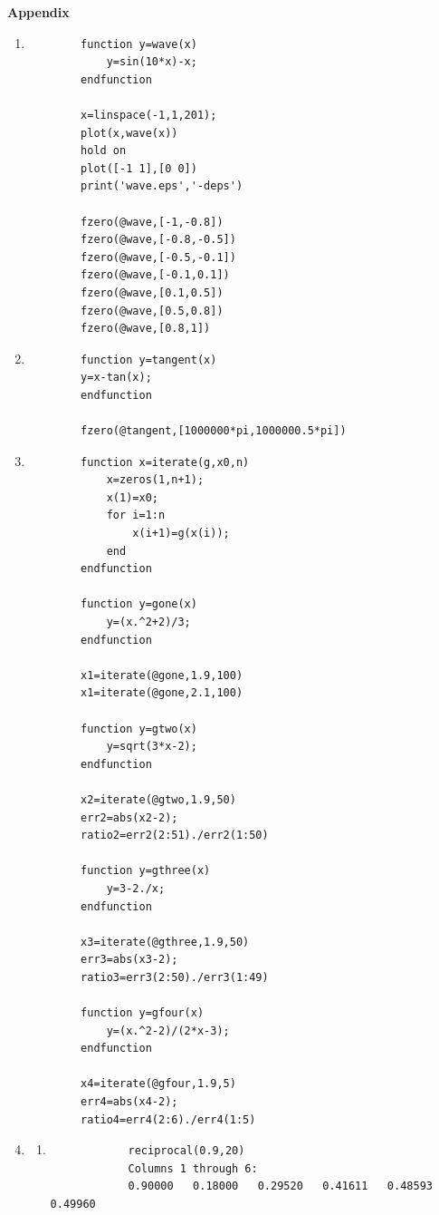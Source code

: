 \documentclass[11pt,a4paper]{article}
\begin{document}
\pagebreak

\textbf{Appendix}

\begin{enumerate}

	\item 
	\begin{verbatim}
		function y=wave(x)
			y=sin(10*x)-x;
		endfunction
		
		x=linspace(-1,1,201);
		plot(x,wave(x))
		hold on 
		plot([-1 1],[0 0])
		print('wave.eps','-deps')

		fzero(@wave,[-1,-0.8])
		fzero(@wave,[-0.8,-0.5])
		fzero(@wave,[-0.5,-0.1])
		fzero(@wave,[-0.1,0.1])
		fzero(@wave,[0.1,0.5])
		fzero(@wave,[0.5,0.8])
		fzero(@wave,[0.8,1])
	\end{verbatim}
	
	\item
	\begin{verbatim}
		function y=tangent(x)
		y=x-tan(x);
		endfunction
		
		fzero(@tangent,[1000000*pi,1000000.5*pi])
	\end{verbatim}
	
	\item
	\begin{verbatim}
		function x=iterate(g,x0,n)
			x=zeros(1,n+1);
			x(1)=x0;
			for i=1:n
				x(i+1)=g(x(i));
			end
		endfunction
		
		function y=gone(x)
			y=(x.^2+2)/3;
		endfunction
		
		x1=iterate(@gone,1.9,100)
		x1=iterate(@gone,2.1,100)
		
		function y=gtwo(x)
			y=sqrt(3*x-2);
		endfunction
		
		x2=iterate(@gtwo,1.9,50)
		err2=abs(x2-2);
		ratio2=err2(2:51)./err2(1:50)
		
		function y=gthree(x)
			y=3-2./x;
		endfunction
		
		x3=iterate(@gthree,1.9,50)
		err3=abs(x3-2);
		ratio3=err3(2:50)./err3(1:49)
		
		function y=gfour(x)
			y=(x.^2-2)/(2*x-3);
		endfunction
		
		x4=iterate(@gfour,1.9,5)
		err4=abs(x4-2);
		ratio4=err4(2:6)./err4(1:5)
	\end{verbatim}
	
	\item
	\begin{enumerate}
		\item
		\begin{verbatim}
			reciprocal(0.9,20)
			Columns 1 through 6:
			0.90000   0.18000   0.29520   0.41611   0.48593   0.49960   


\end{verbatim}
\end{enumerate}
\end{enumerate}
\end{document}
